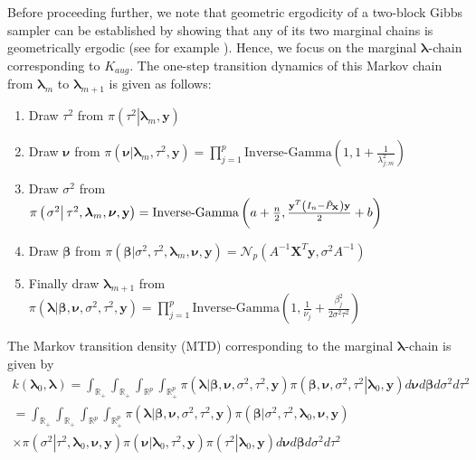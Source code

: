 \documentclass[noinfoline,11pt]{imsart}
\numberwithin{equation}{section}
\theoremstyle{plain}
\newcommand{\y}{\mathbf{y}}
\newcommand{\X}{\mathbf{X}}
\newcommand{\bl}{\boldsymbol{\lambda}}
\begin{document}
Before proceeding further, we note that geometric ergodicity of a two-block Gibbs sampler can be established by showing that any of its two marginal chains is geometrically ergodic (see for example \cite{Roberts:Rosenthal:2001}). Hence, we focus on the marginal ${\boldsymbol \lambda}$-chain corresponding to $K_{aug}$. The one-step transition dynamics of this Markov chain from ${\boldsymbol \lambda}_m$ to ${\boldsymbol \lambda}_{m+1}$ is given as follows: 
\begin{enumerate}
    \item Draw $\tau^2$ from $\pi\left(\left.\tau^2\right|\mathbf{\bl}_m,\mathbf{\y}\right)$
    \item Draw $\boldsymbol{\nu}$ from $\pi\left(\left.\boldsymbol{\nu}\right|\mathbf{\bl}_m,\tau^2,\mathbf{\y}\right)=\prod\limits_{j=1}^p\text{Inverse-Gamma}\left(1,1+\frac{1}{\lambda_{j;m}^2}\right)$
    \item Draw $\sigma^2$ from $\pi\left(\left.\sigma^2\right|\tau^2,\mathbf{\bl}_m,{\boldsymbol \nu},\mathbf{\y}\right)=\text{Inverse-Gamma}\left(a+\frac{n}{2},\frac{\mathbf{\y}^T\left(I_n-\Tilde{P}_\X\right)\mathbf{\y}}{2}+b\right)$
    \item Draw $\boldsymbol{\beta}$ from $\pi\left(\left.\boldsymbol{\beta}\right|\sigma^2,\tau^2,\mathbf{\bl}_m,{\boldsymbol \nu},\mathbf{\y}\right)=\mathcal{N}_p(A^{-1}\X^T\y,\sigma^2A^{-1})$
    \item Finally draw $\mathbf{\bl}_{m+1}$ from $\pi\left(\left.\mathbf{\bl}\right|\boldsymbol{\beta,\nu},\sigma^2,\tau^2,\mathbf{\y}\right)=\prod\limits_{j=1}^p\text{Inverse-Gamma}\left(1,\frac{1}{\nu_j}+\frac{\beta_j^2}{2\sigma^2\tau^2}\right)$
\end{enumerate}
The Markov transition density (MTD) corresponding to the marginal ${\boldsymbol \lambda}$-chain is given by 
\begin{eqnarray}\label{MTD}
    k\left(\mathbf{\bl}_0,\mathbf{\bl}\right)= \int_{\mathbb{R}_+}\int_{\mathbb{R}_{+}}\int_{\mathbb{R}^p}\int_{\mathbb{R}_+^p}\pi\left(\left.\mathbf{\bl}\right|\boldsymbol{\beta,\nu},\sigma^2,\tau^2,\mathbf{\y}\right)\pi\left(\left.\boldsymbol{\beta,\nu},\sigma^2,\tau^2\right|\mathbf{\bl}_0,\mathbf{\y}\right)d\boldsymbol{\nu}d\boldsymbol{\beta}d\sigma^2d\tau^2 \nonumber\\
   = \int_{\mathbb{R}_+}\int_{\mathbb{R}_{+}}\int_{\mathbb{R}^p}\int_{\mathbb{R}^{p}_+}\pi\left(\left.\mathbf{\bl}\right|\boldsymbol{\beta,\nu},\sigma^2,\tau^2,\mathbf{\y}\right)\pi\left(\left.\boldsymbol{\beta}\right|\sigma^2,\tau^2,\mathbf{\bl}_0,{\boldsymbol \nu},\mathbf{\y}\right)\nonumber \\
    \times\pi\left(\left.\sigma^2\right|\tau^2,\mathbf{\bl}_0,{\boldsymbol \nu},\mathbf{\y}\right)\pi\left(\left.\boldsymbol{\nu}\right|\mathbf{\bl}_0,\tau^2,\mathbf{\y}\right)\pi\left(\left.\tau^2\right|\mathbf{\bl}_0,\mathbf{\y}\right)d\boldsymbol{\nu}d\boldsymbol{\beta}d\sigma^2d\tau^2 
\end{eqnarray}
\end{document}
